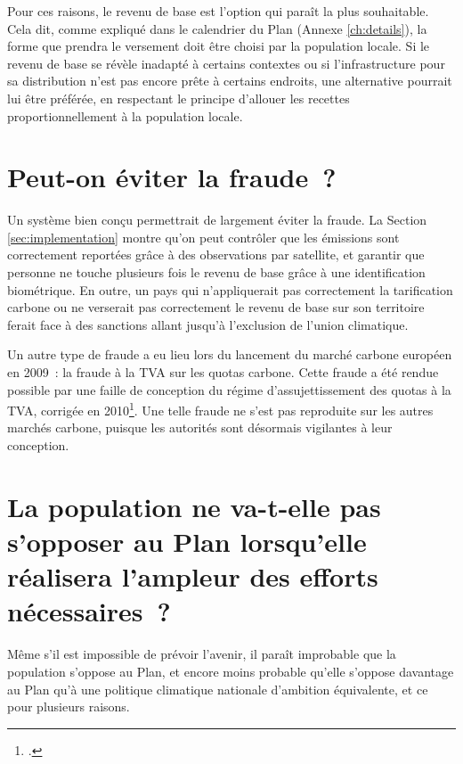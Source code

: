 \documentclass[a5paper,french,openany]{memoir}
\begin{document}
Pour ces raisons, le revenu de base est l'option qui paraît la plus souhaitable. Cela dit, comme expliqué dans le calendrier du Plan (Annexe \ref{ch:details}), la forme que prendra le versement doit être choisi par la population locale. Si le revenu de base se révèle inadapté à certains contextes ou si l'infrastructure pour sa distribution n'est pas encore prête à certains endroits, une alternative pourrait lui être préférée, en respectant le principe d'allouer les recettes proportionnellement à la population locale. 

\section*{\normalsize Peut-on éviter la fraude~?}\label{q:fraude}

Un système bien conçu permettrait de largement éviter la fraude. La Section \ref{sec:implementation} montre qu'on peut contrôler que les émissions sont correctement reportées grâce à des observations par satellite, et garantir que personne ne touche plusieurs fois le revenu de base grâce à une identification biométrique. En outre, un pays qui n'appliquerait pas correctement la tarification carbone ou ne verserait pas correctement le revenu de base sur son territoire ferait face à des sanctions allant jusqu'à l'exclusion de l'union climatique. 

Un autre type de fraude a eu lieu lors du lancement du marché carbone européen en 2009~: la fraude à la TVA sur les quotas carbone. Cette fraude a été rendue possible par une faille de conception du régime d'assujettissement des quotas à la TVA, corrigée en 2010\footnote{\cite{cour_des_comptes_fraude_2012}.}. Une telle fraude ne s'est pas reproduite sur les autres marchés carbone, puisque les autorités sont désormais vigilantes à leur conception.


\section*{\normalsize La population ne va-t-elle pas s'opposer au Plan lorsqu'elle réalisera l'ampleur des efforts nécessaires~?}\label{q:soutien}

Même s'il est impossible de prévoir l'avenir, il paraît improbable que la population s'oppose au Plan, et encore moins probable %
qu'elle s'oppose davantage au Plan qu'à une politique climatique nationale d'ambition équivalente, et ce pour plusieurs raisons. 
\end{document}

